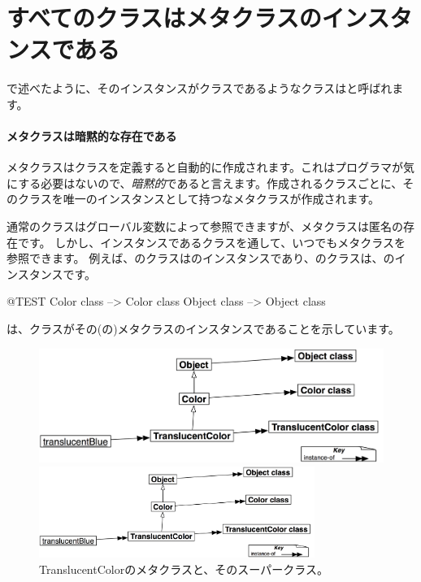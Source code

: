 \documentclass[a4paper,10pt,twoside]{book}
\begin{document}
\section{すべてのクラスはメタクラスのインスタンスである}


で述べたように、そのインスタンスがクラスであるようなクラスはと呼ばれます。

\paragraph{メタクラスは暗黙的な存在である}
メタクラスはクラスを定義すると自動的に作成されます。これはプログラマが気にする必要はないので、\emph{暗黙的}であると言えます。作成されるクラスごとに、そのクラスを唯一のインスタンスとして持つなメタクラスが作成されます。

通常のクラスはグローバル変数によって参照できますが、メタクラスは匿名の存在です。
しかし、インスタンスであるクラスを通して、いつでもメタクラスを参照できます。
例えば、のクラスはのインスタンスであり、のクラスは、のインスタンスです。
\begin{code}{@TEST}
Color class   --> Color class
Object class --> Object class
\end{code}

\noindent
{}は、クラスがその(の)メタクラスのインスタンスであることを示しています。

\begin{center}
\begin{figure}[!ht]
\ifluluelse
	{\centerline {\includegraphics[width=\textwidth]{TranslucentMetaclasses}}}
	{\centerline {\includegraphics[width=0.8\textwidth]{TranslucentMetaclasses}}}
\caption{TranslucentColorのメタクラスと、そのスーパークラス。}
\end{figure}
\end{center}
\end{document}
